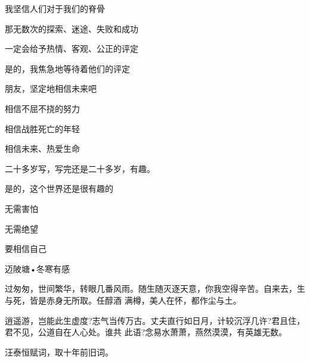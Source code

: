 \documentclass[11pt,a4paper,onecolumn]{article}
\begin{document}
\begin{wuxchpoem}
我坚信人们对于我们的脊骨

那无数次的探索、迷途、失败和成功

一定会给予热情、客观、公正的评定

是的，我焦急地等待着他们的评定
\end{wuxchpoem}

\begin{wuxchpoem}
朋友，坚定地相信未来吧

相信不屈不挠的努力

相信战胜死亡的年轻

相信未来、热爱生命
\end{wuxchpoem}


二十多岁写，写完还是二十多岁，有趣。

是的，这个世界还是很有趣的

无需害怕

无需绝望

要相信自己

\begin{center}
\begin{minipage}[t]{0.7\textwidth}
\itshape
\begin{Large}
\begin{center}
迈陂塘•冬寒有感
\end{center}

过匆匆，世间繁华，转眼几番风雨。随生随灭逐天意，你我空得辛苦。自来去，生与死，皆是赤身无所取。任醇酒
满樽，美人在怀，都作尘与土。
\end{Large}
\end{minipage}

\begin{minipage}[t]{0.7\textwidth}
\itshape
\begin{Large}
逍遥游，岂能此生虚度?志气当传万古。丈夫直行如日月，计较沉浮几许?君且住，君不见，公道自在人心处。谁共
此语?念易水萧萧，燕然漠漠，有英雄无数。
\end{Large}
\end{minipage}
\end{center}

\begin{flushright}
汪泰恒赋词，取十年前旧词。
\end{flushright}
\end{document}
